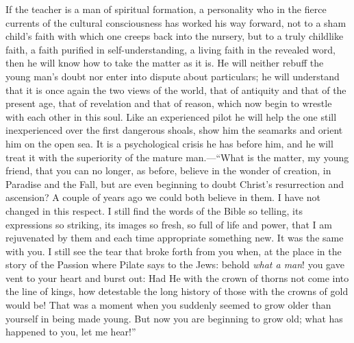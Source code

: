 \documentclass[12pt,a4paper,openany]{book}
\newcommand{\opage}[1]{\marginnote{\footnotesize\textit{[#1]}}}
\begin{document}
If the teacher is a man of spiritual formation, a personality who in the
fierce currents of the cultural consciousness has worked his way forward,
not to a sham child's faith with which one creeps back into the nursery,
but to a truly childlike faith, a faith purified in self-understanding, a
living faith in the revealed word, then he will know how to take the
matter as it is. He will neither rebuff the young man's doubt nor enter
into dispute about particulars; he will understand that it is once again
the two views of the world, that of antiquity and that of the present
age, that of revelation and that of reason, which now begin to wrestle
with each other in this soul. Like an experienced pilot he will help the
one still inexperienced over the first dangerous shoals, show him the
seamarks and orient him on the open sea. It is a psychological crisis he
has before him, and he will treat it with the superiority of the mature
man.---``What is the matter, my young friend, that you can no longer, as
before, believe in the wonder of creation, in Paradise and the Fall, but
are even beginning to doubt Christ's resurrection and ascension? A couple
of years ago we could both \opage{47}believe in them. I have not changed in this
respect. I still find the words of the Bible so telling, its expressions
so striking, its images so fresh, so full of life and power, that I am
rejuvenated by them and each time appropriate something new. It was the
same with you. I still see the tear that broke forth from you when, at
the place in the story of the Passion where Pilate says to the Jews:
behold \emph{what a man}! you gave vent to your heart and burst out: Had
He with the crown of thorns not come into the line of kings, how
detestable the long history of those with the crowns of gold would be! That
was a moment when you suddenly seemed to grow older than yourself in
being made young. But now you are beginning to grow old; what has
happened to you, let me hear!''
\end{document}
